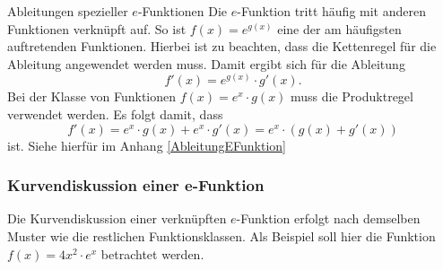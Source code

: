 \begin{satz}{Ableitungen spezieller $e$-Funktionen}{}
Die $e$-Funktion tritt häufig mit anderen Funktionen verknüpft auf. So ist $f(x) = e^{g(x)}$ eine der am häufigsten auftretenden Funktionen. Hierbei ist zu beachten, dass die Kettenregel für die Ableitung angewendet werden muss. Damit ergibt sich für die Ableitung $$f'(x) = e^{g(x)} \cdot g'(x).$$  Bei der Klasse von Funktionen $f(x) = e^x \cdot g(x)$ muss die Produktregel verwendet werden. Es folgt damit, dass $$f'(x) = e^x \cdot g(x) + e^x \cdot g'(x) = e^x\cdot (g(x)+ g'(x))$$ ist. Siehe hierfür im Anhang \ref{AbleitungEFunktion}
\end{satz}
 \subsubsection{Kurvendiskussion einer e-Funktion}
 Die Kurvendiskussion einer verknüpften $e$-Funktion erfolgt nach demselben Muster wie die restlichen Funktionsklassen. Als Beispiel soll hier die Funktion $f(x) = 4x^2\cdot e^x$ betrachtet werden.
